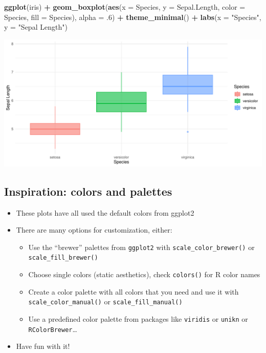 \documentclass[
]{book}
\newenvironment{Shaded}{\begin{snugshade}}{\end{snugshade}}
\newcommand{\AttributeTok}[1]{\textcolor[rgb]{0.13,0.29,0.53}{#1}}
\newcommand{\DecValTok}[1]{\textcolor[rgb]{0.00,0.00,0.81}{#1}}
\newcommand{\FunctionTok}[1]{\textcolor[rgb]{0.13,0.29,0.53}{\textbf{#1}}}
\newcommand{\NormalTok}[1]{#1}
\newcommand{\SpecialCharTok}[1]{\textcolor[rgb]{0.81,0.36,0.00}{\textbf{#1}}}
\newcommand{\StringTok}[1]{\textcolor[rgb]{0.31,0.60,0.02}{#1}}
\providecommand{\tightlist}{%
  \setlength{\itemsep}{0pt}\setlength{\parskip}{0pt}}
\begin{document}
\begin{Shaded}
\begin{Highlighting}[]
\FunctionTok{ggplot}\NormalTok{(iris) }\SpecialCharTok{+} 
  \FunctionTok{geom\_boxplot}\NormalTok{(}\FunctionTok{aes}\NormalTok{(}\AttributeTok{x =}\NormalTok{ Species, }\AttributeTok{y =}\NormalTok{ Sepal.Length,}
                   \AttributeTok{color =}\NormalTok{ Species, }\AttributeTok{fill =}\NormalTok{ Species), }\AttributeTok{alpha =}\NormalTok{ .}\DecValTok{6}\NormalTok{) }\SpecialCharTok{+}
  \FunctionTok{theme\_minimal}\NormalTok{() }\SpecialCharTok{+} \FunctionTok{labs}\NormalTok{(}\AttributeTok{x =} \StringTok{"Species"}\NormalTok{, }\AttributeTok{y =} \StringTok{"Sepal Length"}\NormalTok{)}
\end{Highlighting}
\end{Shaded}

\begin{flushleft}\includegraphics{_main_files/figure-latex/unnamed-chunk-56-1} \end{flushleft}

\subsection{Inspiration: colors and palettes}\label{inspiration-colors-and-palettes}

\begin{itemize}
\tightlist
\item
  These plots have all used the default colors from ggplot2
\item
  There are many options for customization, either:

  \begin{itemize}
  \tightlist
  \item
    Use the ``brewer'' palettes from \texttt{ggplot2} with \texttt{scale\_color\_brewer()} or \texttt{scale\_fill\_brewer()}
  \item
    Choose single colors (static aesthetics), check \texttt{colors()} for R color names
  \item
    Create a color palette with all colors that you need and use it with \texttt{scale\_color\_manual()} or \texttt{scale\_fill\_manual()}
  \item
    Use a predefined color palette from packages like \texttt{viridis} or \texttt{unikn} or \texttt{RColorBrewer}\ldots{}
  \end{itemize}
\item
  Have fun with it!
\end{itemize}
\end{document}
